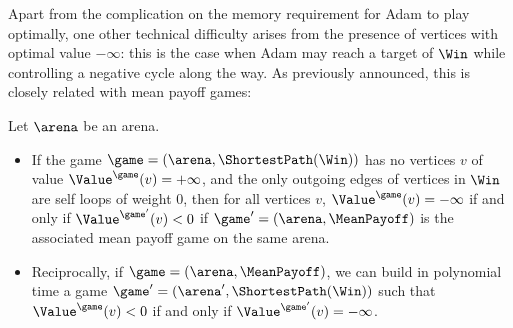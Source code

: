 Apart from the complication on the memory requirement for Adam to play
optimally, one other technical difficulty arises from the presence of
vertices with optimal value $-\infty$: this is the case when Adam may
reach a target of $\Win$ while controlling a negative cycle along the
way. As previously announced, this is closely related with mean payoff
games: \cite{Brihaye&Geeraerts&HaddadA&Monmege:2017}
\begin{theorem}\label{4-thm:-infty-MP}
  Let $\arena$ be an arena.
  \begin{itemize}
  \item If the game $\game=(\arena,\ShortestPath(\Win))$ has no
    vertices $v$ of value $\Value^\game(v)=+\infty$, and the only
    outgoing edges of vertices in $\Win$ are self loops of weight $0$,
    then for all vertices $v$, $\Value^\game(v)=-\infty$ if and only
    if $\Value^{\game'}(v)<0$ if $\game'=(\arena,\MeanPayoff)$ is the
    associated mean payoff game on the same arena.
  \item Reciprocally, if $\game=(\arena,\MeanPayoff)$, we can build in
    polynomial time a game $\game'=(\arena',\ShortestPath(\Win))$ such
    that $\Value^\game(v)<0$ if and only if
    $\Value^{\game'}(v) =-\infty$.
  \end{itemize}
\end{theorem}
